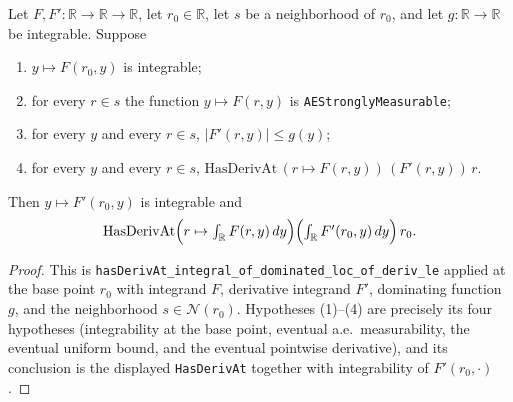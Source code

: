 \begin{lemma}
    \label{lem:hasDerivAt_under_integral}
    \leanok
    Let $F, F' : \mathbb{R} \to \mathbb{R} \to \mathbb{R}$, let $r_0 \in \mathbb{R}$, let
    $s$ be a neighborhood of $r_0$, and let $g : \mathbb{R} \to \mathbb{R}$ be
    integrable. Suppose
    \begin{enumerate}
        \item $y \mapsto F(r_0, y)$ is integrable;
        \item for every $r \in s$ the function $y \mapsto F(r,y)$ is
              \texttt{AEStronglyMeasurable};
        \item for every $y$ and every $r \in s$, $\lvert F'(r,y)\rvert \le g(y)$;
        \item for every $y$ and every $r \in s$,
              $\mathrm{HasDerivAt}\,(r \mapsto F(r,y))\,(F'(r,y))\,r$.
    \end{enumerate}
    Then $y \mapsto F'(r_0,y)$ is integrable and
    \[ \mathrm{HasDerivAt}\Bigl(r \mapsto \textstyle\int_{\mathbb{R}} F(r,y)\,dy\Bigr)
       \Bigl(\textstyle\int_{\mathbb{R}} F'(r_0,y)\,dy\Bigr)\, r_0. \]
\end{lemma}
\begin{proof}
    This is \texttt{hasDerivAt\_integral\_of\_dominated\_loc\_of\_deriv\_le} applied at
    the base point $r_0$ with integrand $F$, derivative integrand $F'$, dominating
    function $g$, and the neighborhood $s \in \mathcal{N}(r_0)$. Hypotheses (1)--(4) are
    precisely its four hypotheses (integrability at the base point, eventual a.e.\
    measurability, the eventual uniform bound, and the eventual pointwise derivative),
    and its conclusion is the displayed \texttt{HasDerivAt} together with integrability
    of $F'(r_0,\cdot)$.
\end{proof}

